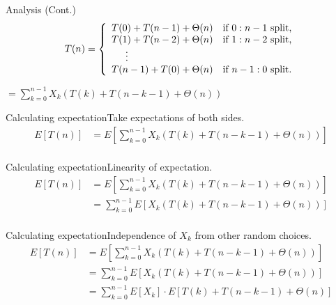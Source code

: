 \documentclass{beamer}
\begin{document}
\begin{frame}{Analysis (Cont.)}
    $$
        T(n) = \left\{
            \begin{array}{l l}
                T(0) + T(n - 1) + \Theta(n) & \text{if } 0 : n - 1 \text{ split,} \\
                T(1) + T(n - 2) + \Theta(n) & \text{if } 1 : n - 2 \text{ split,} \\
                \text{\hspace{5mm}} \vdots & \\
                T(n - 1) + T(0) + \Theta(n) & \text{if } n - 1 : 0 \text{ split.} \\
            \end{array}
        \right.
    $$

    \vspace{10mm}
    \centering
    \Large
    $= \sum\limits_{k=0}^{n-1} X_k(T(k) + T(n - k - 1) + \Theta(n))$
\end{frame}

\begin{frame}{Calculating expectation}{Take expectations of both sides.}
    \begin{equation*}
        \begin{split}
E[T(n)] &= E\left[ \sum\limits_{k=0}^{n-1} X_k(T(k) + T(n - k - 1) + \Theta(n)) \right] \\
        \end{split}
    \end{equation*}
\end{frame}

\begin{frame}{Calculating expectation}{Linearity of expectation.}
    \begin{equation*}
        \begin{split}
E[T(n)] &= E\left[ \sum\limits_{k=0}^{n-1} X_k(T(k) + T(n - k - 1) + \Theta(n)) \right] \\
        &= \sum\limits_{k=0}^{n-1} E\left[ X_k(T(k) + T(n - k - 1) + \Theta(n)) \right] \\
        \end{split}
    \end{equation*}
\end{frame}

\begin{frame}{Calculating expectation}{Independence of $X_k$ from other random choices.}
    \begin{equation*}
        \begin{split}
E[T(n)] &= E\left[ \sum\limits_{k=0}^{n-1} X_k(T(k) + T(n - k - 1) + \Theta(n)) \right] \\
        &= \sum\limits_{k=0}^{n-1} E\left[ X_k(T(k) + T(n - k - 1) + \Theta(n)) \right] \\
        &= \sum\limits_{k=0}^{n-1} E[X_k] \cdot E[T(k) + T(n - k - 1) + \Theta(n)] \\
        \end{split}
    \end{equation*}
\end{frame}
\end{document}
